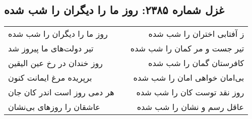 \begin{center}
\section*{غزل شماره ۲۳۸۵: روز ما را دیگران را شب شده}
\label{sec:2385}
\begin{longtable}{l p{0.5cm} r}
روز ما را دیگران را شب شده
&&
ز آفتابی اختران را شب شده
\\
تیر دولت‌های ما پیروز شد
&&
تیر جست و مر کمان را شب شده
\\
روز خندان در رخ عین الیقین
&&
کافرستان گمان را شب شده
\\
برپریده مرغ ایمانت کنون
&&
بی‌امان خواهی امان را شب شده
\\
هر دمی روز است اندر کان جان
&&
روز نقد توست کان را شب شده
\\
عاشقان را روزهای بی‌نشان
&&
عاقل رسم و نشان را شب شده
\\
\end{longtable}
\end{center}
